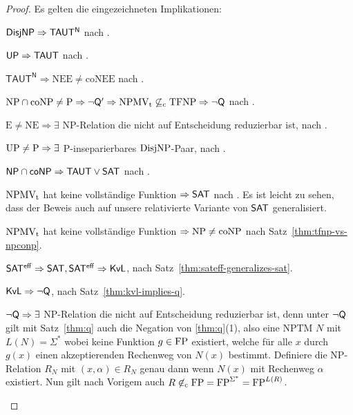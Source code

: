 \begin{proof}
    Es gelten die eingezeichneten Implikationen:
    \begin{Prooflist}[nosep]
\item $\mathsf{DisjNP} \Rightarrow \mathsf{TAUT^N}$ nach \textcite{kobler_optimal_2003}.
\item $\mathsf{UP} \Rightarrow \mathsf{TAUT}$ nach \textcite[Cor.~4.1]{kobler_optimal_2003}. %
\item $\mathsf{TAUT^N}\Rightarrow \mathrm{NEE\neq coNEE}$ nach \textcite{kobler_optimal_2003}.
\item $\mathrm{NP}\cap\mathrm{coNP}\neq \mathrm{P} \Rightarrow \neg\mathsf{Q}' \Rightarrow \mathrm{NPMV_t} \not\subseteq_\mathrm{c} \mathrm{TFNP} \Rightarrow \neg\mathsf{Q}$ nach \textcite{fenner_inverting_2003}.
\item $\mathrm{E\neq NE}\Rightarrow \exists$ NP-Relation die nicht auf Entscheidung reduzierbar ist, nach \textcite{impagliazzo_1991}.
\item $\mathrm{UP}\neq\mathrm{P} \Rightarrow \exists$ P-inseparierbares $\mathrm{DisjNP}$-Paar, nach \textcite[Thm.~5]{grollmann_complexity_1988}.
\item $\mathsf{NP}{}\cap{}\mathsf{coNP}\Rightarrow \mathsf{TAUT}\lor\mathsf{SAT}$ nach \textcite[Cor.~5.1]{kobler_optimal_2003}. %
\item $\mathrm{NPMV_t}$ hat keine vollständige Funktion $\Rightarrow \mathsf{SAT}$ nach \textcite[Thm.~25]{beyersdorff_nondeterministic_2009}. Es ist leicht zu sehen, dass der Beweis auch auf unsere relativierte Variante von $\mathsf{SAT}$ generalisiert.
\item $\mathrm{NPMV_t}$ hat keine vollständige Funktion $\Rightarrow \mathrm{NP}\neq\mathrm{coNP}$ nach Satz~\ref{thm:tfnp-vs-npconp}.
\item $\mathsf{SAT^{eff}} \Rightarrow \mathsf{SAT}, \mathsf{SAT^{eff}}\Rightarrow \mathsf{KvL}$, nach Satz~\ref{thm:sateff-generalizes-sat}.
\item $\mathsf{KvL}\Rightarrow\neg\mathsf{Q}$, nach Satz~\ref{thm:kvl-implies-q}.
\item $\neg\mathsf{Q}\Rightarrow \exists$ NP-Relation die nicht auf Entscheidung reduzierbar ist, denn unter $\neg\mathsf{Q}$ gilt mit Satz~\ref{thm:q} auch die Negation von \ref{thm:q}(1), also eine NPTM $N$ mit $L(N)=\Sigma^*$ wobei keine Funktion $g\in\mathrm{FP}$ existiert, welche für alle $x$ durch $g(x)$ einen akzeptierenden Rechenweg von $N(x)$ bestimmt.
    Definiere die NP-Relation $R_N$ mit $(x,\alpha)\in R_N$ genau dann wenn $N(x)$ mit Rechenweg $\alpha$ existiert. Nun gilt nach Vorigem auch $R\not\in_\mathrm{c} \mathrm{FP}=\mathrm{FP}^{\Sigma^*} = \mathrm{FP}^{L(R)}$.

\end{Prooflist}
\end{proof}
